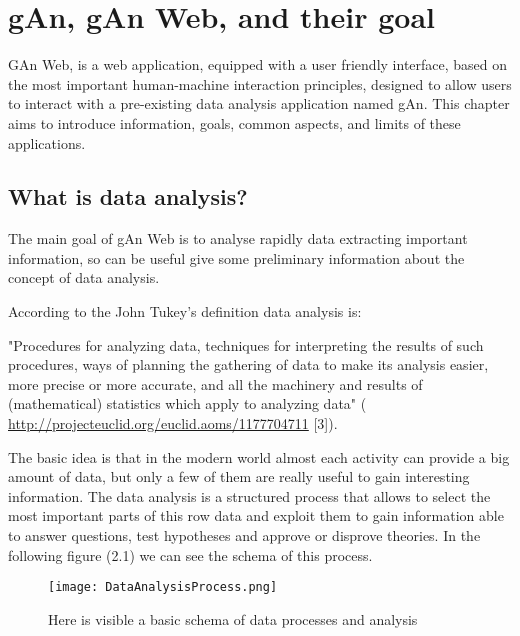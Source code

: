 
\chapter{gAn, gAn Web, and their goal} %

\label{Chapter2} %


GAn Web, is a web application, equipped with a user friendly interface, based on the most important human-machine interaction principles, designed to allow users to interact with a pre-existing data analysis application named gAn. This chapter aims to introduce information, goals, common aspects, and limits of these applications.

\section{What is data analysis?}

The main goal of gAn Web is to analyse rapidly data extracting important information, so can be useful give some preliminary information about the concept of data analysis.

According to the John Tukey's definition data analysis is: 

"Procedures for analyzing data, techniques for interpreting the results of such procedures, ways of planning the gathering of data to make its analysis easier, more precise or more accurate, and all the machinery and results of (mathematical) statistics which apply to analyzing data" 
( \url{http://projecteuclid.org/euclid.aoms/1177704711} [3]).

The basic idea is that in the modern world almost each activity can provide a big amount of data, but only a few of them are really useful to gain interesting information. The data analysis is a structured process that allows to select the most important parts of this row data and exploit them to gain information able to answer questions, test hypotheses and approve or disprove theories.
In the following figure (2.1) we can see the schema of this process. 

\begin{figure}[H]
\centering
\texttt{[image: DataAnalysisProcess.png]} 
\caption{Here is visible a basic schema of data processes and analysis}
\end{figure}

